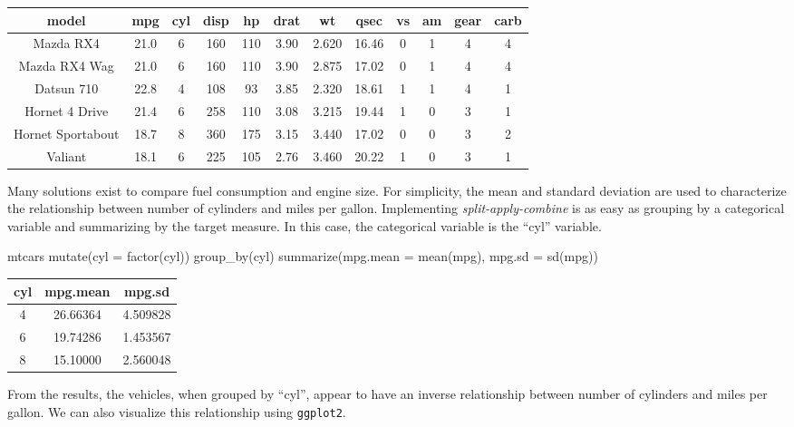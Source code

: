 \begin{tabular}{cccccccccccc}
\toprule
model & mpg & cyl & disp & hp & drat & wt & qsec & vs & am & gear & carb\\
\midrule
Mazda RX4 & 21.0 & 6 & 160 & 110 & 3.90 & 2.620 & 16.46 & 0 & 1 & 4 & 4\\
Mazda RX4 Wag & 21.0 & 6 & 160 & 110 & 3.90 & 2.875 & 17.02 & 0 & 1 & 4 & 4\\
Datsun 710 & 22.8 & 4 & 108 & 93 & 3.85 & 2.320 & 18.61 & 1 & 1 & 4 & 1\\
Hornet 4 Drive & 21.4 & 6 & 258 & 110 & 3.08 & 3.215 & 19.44 & 1 & 0 & 3 & 1\\
Hornet Sportabout & 18.7 & 8 & 360 & 175 & 3.15 & 3.440 & 17.02 & 0 & 0 & 3 & 2\\
Valiant & 18.1 & 6 & 225 & 105 & 2.76 & 3.460 & 20.22 & 1 & 0 & 3 & 1\\
\bottomrule
\end{tabular}

\hspace{20 mm}

Many solutions exist to compare fuel consumption and engine size. For
simplicity, the mean and standard deviation are used to characterize the
relationship between number of cylinders and miles per gallon.
Implementing \emph{split-apply-combine} is as easy as grouping by a
categorical variable and summarizing by the target measure. In this
case, the categorical variable is the ``cyl'' variable.

\begin{Schunk}
\begin{Sinput}
mtcars %
    mutate(cyl = factor(cyl)) %
    group_by(cyl) %
    summarize(mpg.mean = mean(mpg),
              mpg.sd = sd(mpg))
\end{Sinput}
\end{Schunk}

\begin{tabular}{ccc}
\toprule
cyl & mpg.mean & mpg.sd\\
\midrule
4 & 26.66364 & 4.509828\\
6 & 19.74286 & 1.453567\\
8 & 15.10000 & 2.560048\\
\bottomrule
\end{tabular}

\hspace{20 mm}

From the results, the vehicles, when grouped by ``cyl'', appear to have
an inverse relationship between number of cylinders and miles per
gallon. We can also visualize this relationship using \texttt{ggplot2}.

